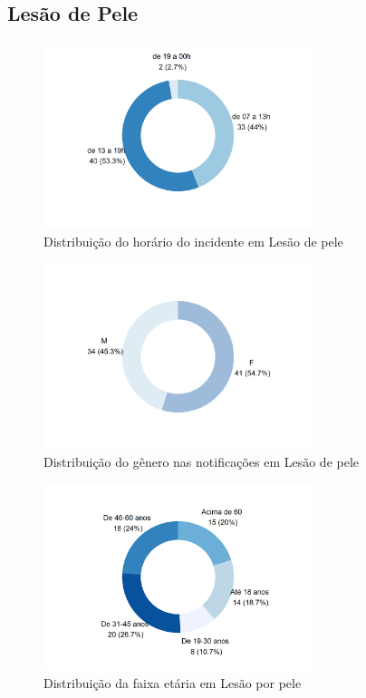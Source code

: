 \documentclass[
  a4paper]{article}
\begin{document}
\subsection{Lesão de Pele}

\begin{figure}[H]
\caption{Distribuição do horário do incidente em Lesão de pele}
\includegraphics[width=0.7\textwidth]{Imagens/pele_periodo.png}
\end{figure}

\begin{figure}[H]
\caption{Distribuição do gênero nas notificações em Lesão de pele}
\includegraphics[width=0.7\textwidth]{Imagens/pele_SEXO.png}
\end{figure}

\begin{figure}[H]
\caption{Distribuição da faixa etária em Lesão por pele}
\includegraphics[width=0.7\textwidth]{Imagens/pele_faixa_etaria.png}
\end{figure}
\end{document}
